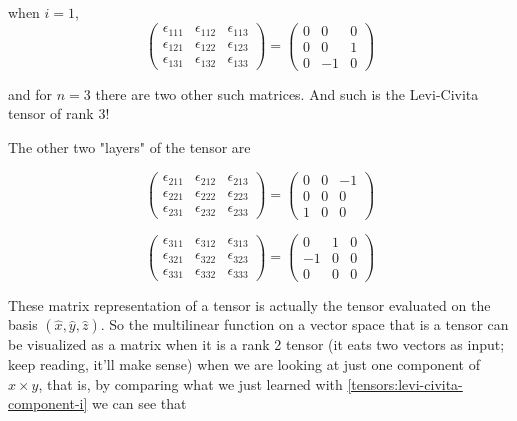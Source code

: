when $i=1$,
$$
\begin{pmatrix}
\epsilon_{111} & \epsilon_{112} & \epsilon_{113} \\
\epsilon_{121} & \epsilon_{122} & \epsilon_{123} \\
\epsilon_{131} & \epsilon_{132} & \epsilon_{133}
\end{pmatrix}
=
\begin{pmatrix}
0 & 0 & 0 \\
0 & 0 & 1 \\
0 & -1 & 0
\end{pmatrix}
$$

and for $n=3$ there are two other such matrices.
And such is the Levi-Civita tensor of rank 3!

The other two "layers" of the tensor are

$$
\begin{pmatrix}
\epsilon_{211} & \epsilon_{212} & \epsilon_{213} \\
\epsilon_{221} & \epsilon_{222} & \epsilon_{223} \\
\epsilon_{231} & \epsilon_{232} & \epsilon_{233}
\end{pmatrix}
=
\begin{pmatrix}
0 & 0 & -1 \\
0 & 0 & 0 \\
1 & 0 & 0
\end{pmatrix}
$$

$$
\begin{pmatrix}
\epsilon_{311} & \epsilon_{312} & \epsilon_{313} \\
\epsilon_{321} & \epsilon_{322} & \epsilon_{323} \\
\epsilon_{331} & \epsilon_{332} & \epsilon_{333}
\end{pmatrix}
=
\begin{pmatrix}
0 & 1 & 0 \\
-1 & 0 & 0 \\
0 & 0 & 0
\end{pmatrix}
$$

These matrix representation of a tensor is actually the tensor evaluated on the basis $(\hat{x}, \hat{y}, \hat{z})$.
So the multilinear function on a vector space that is a tensor can be visualized as a matrix when it is a rank 2 tensor
(it eats two vectors as input; keep reading, it'll make sense) when we are looking at just one component of
$x \times y$, that is, by comparing what we just learned with \ref{tensors:levi-civita-component-i} we can see that

